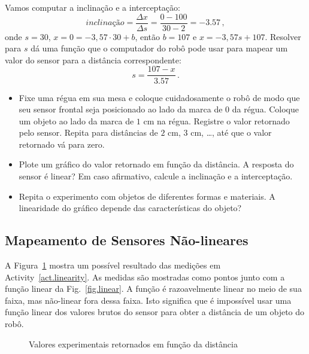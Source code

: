 Vamos computar a inclinação e a interceptação:
\[
\mathit{inclinação} = \frac{\Delta x}{\Delta s} = \frac{0-100}{30-2}=-3.57\,,
\]
onde $s=30$, $x=0=-3,57\cdot 30+b$, então $b=107$ e $x = -3,57 s + 107$. Resolver para $s$ dá uma função que o computador do robô pode usar para mapear um valor do sensor para a distância correspondente:
\[
s = \frac{107-x}{3.57}\,.
\]

\begin{framed}
\begin{itemize}
\item Fixe uma régua em sua mesa e coloque cuidadosamente o robô de modo que seu sensor frontal seja posicionado ao lado da marca de $0$ da régua. Coloque um objeto ao lado da marca de $1$ cm na régua. Registre o valor retornado pelo sensor. Repita para distâncias de $2$ cm, $3$ cm, \ldots, até que o valor retornado vá para zero.
\item Plote um gráfico do valor retornado em função da distância. A resposta do sensor é linear? Em caso afirmativo, calcule a inclinação e a interceptação.
\item Repita o experimento com objetos de diferentes formas e materiais. A linearidade do gráfico depende das características do objeto?
\end{itemize}
\end{framed}

\subsection{Mapeamento de Sensores Não-lineares}

A Figura~\ref{fig.nonlinear} mostra um possível resultado das medições em Activity~\ref{act.linearity}. As medidas são mostradas como pontos junto com a função linear da Fig.~\ref{fig.linear}. A função é razoavelmente linear no meio de sua faixa, mas não-linear fora dessa faixa. Isto significa que é impossível usar uma função linear dos valores brutos do sensor para obter a distância de um objeto do robô.

\begin{figure}
\begin{center}
\caption{Valores experimentais retornados em função da distância}\label{fig.nonlinear}
\end{center}
\end{figure}

